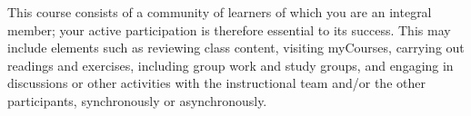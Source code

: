 This course consists of a community of learners of which you are an
integral member; your active participation is therefore essential to
its success. This may include elements such as reviewing class
content, visiting myCourses, carrying out readings and exercises,
including group work and study groups, and engaging in discussions or
other activities with the instructional team and/or the other
participants, synchronously or asynchronously.
